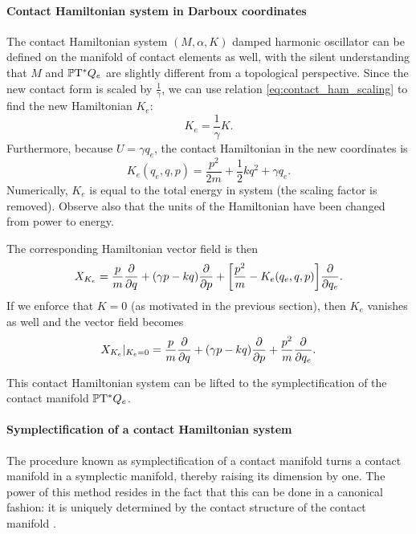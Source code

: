 \paragraph{Contact Hamiltonian system in Darboux coordinates} The contact Hamiltonian system \((M, \alpha, K)\) damped harmonic oscillator can be defined on the manifold of contact elements as well, with the silent understanding that \(M\) and \(\mathbb{P}\mathrm{T}^* Q_e\) are slightly different from a topological perspective. Since the new contact form is scaled by \(\tfrac{1}{\gamma}\), we can use relation \cref{eq:contact_ham_scaling} to find the new Hamiltonian \(K_e\):
\begin{equation}
     K_e = \frac{1}{\gamma} K.
\end{equation}
Furthermore, because \(U = \gamma q_e\), the contact Hamiltonian in the new coordinates is
\begin{equation}
    K_e(q_e, q, p) = \frac{p^2}{2m} + \frac{1}{2}kq^2 + \gamma q_e.
    \label{eq:dho_contact_hamiltonian_e}
\end{equation}
Numerically, \(K_e\) is equal to the total energy in system (the scaling factor is removed). Observe also that the units of the Hamiltonian have been changed from power to energy.

The corresponding Hamiltonian vector field is then
\begin{equation}
    X_{K_e} = \frac{p}{m}\pdv{}{q} + (\gamma p - kq) \pdv{}{p} + \qty[\frac{p^2}{m} - K_e(q_e, q, p)]\pdv{}{q_e}. 
    \label{eq:ham_vf_e}
\end{equation}
If we enforce that \(K = 0\) (as motivated in the previous section), then \(K_e\) vanishes as well and the vector field becomes 
\begin{equation}
    X_{K_e}\vert_{K_e = 0} = \frac{p}{m}\pdv{}{q} + (\gamma p - kq) \pdv{}{p} + \frac{p^2}{m}\pdv{}{q_e}.
    \label{eq:ham_vf_e_liouville}
\end{equation}

This contact Hamiltonian system can be lifted to the symplectification of the contact manifold \(\mathbb{P}\mathrm{T}^* Q_e\).

\paragraph{Symplectification of a contact Hamiltonian system} The procedure known as symplectification of a contact manifold turns a contact manifold in a symplectic manifold, thereby raising its dimension by one. The power of this method resides in the fact that this can be done in a canonical fashion: it is uniquely determined by the contact structure of the contact manifold \cite{Arnold1989}.

